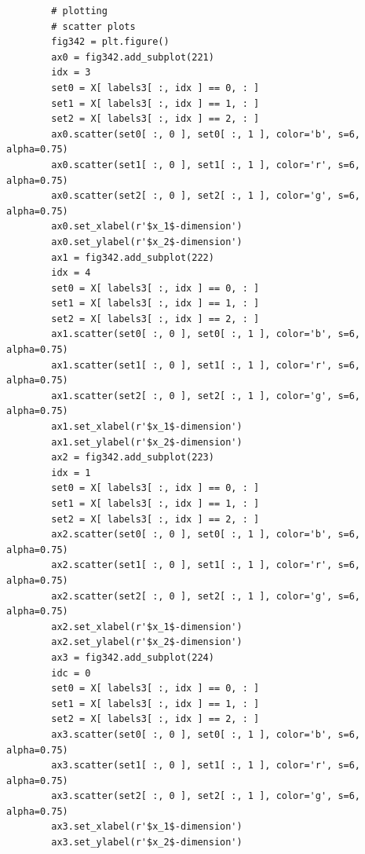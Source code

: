 \begin{verbatim}
        # plotting
        # scatter plots
        fig342 = plt.figure()
        ax0 = fig342.add_subplot(221)
        idx = 3
        set0 = X[ labels3[ :, idx ] == 0, : ]
        set1 = X[ labels3[ :, idx ] == 1, : ]
        set2 = X[ labels3[ :, idx ] == 2, : ]
        ax0.scatter(set0[ :, 0 ], set0[ :, 1 ], color='b', s=6, alpha=0.75)
        ax0.scatter(set1[ :, 0 ], set1[ :, 1 ], color='r', s=6, alpha=0.75)
        ax0.scatter(set2[ :, 0 ], set2[ :, 1 ], color='g', s=6, alpha=0.75)
        ax0.set_xlabel(r'$x_1$-dimension')
        ax0.set_ylabel(r'$x_2$-dimension')
        ax1 = fig342.add_subplot(222)
        idx = 4
        set0 = X[ labels3[ :, idx ] == 0, : ]
        set1 = X[ labels3[ :, idx ] == 1, : ]
        set2 = X[ labels3[ :, idx ] == 2, : ]
        ax1.scatter(set0[ :, 0 ], set0[ :, 1 ], color='b', s=6, alpha=0.75)
        ax1.scatter(set1[ :, 0 ], set1[ :, 1 ], color='r', s=6, alpha=0.75)
        ax1.scatter(set2[ :, 0 ], set2[ :, 1 ], color='g', s=6, alpha=0.75)
        ax1.set_xlabel(r'$x_1$-dimension')
        ax1.set_ylabel(r'$x_2$-dimension')
        ax2 = fig342.add_subplot(223)
        idx = 1
        set0 = X[ labels3[ :, idx ] == 0, : ]
        set1 = X[ labels3[ :, idx ] == 1, : ]
        set2 = X[ labels3[ :, idx ] == 2, : ]
        ax2.scatter(set0[ :, 0 ], set0[ :, 1 ], color='b', s=6, alpha=0.75)
        ax2.scatter(set1[ :, 0 ], set1[ :, 1 ], color='r', s=6, alpha=0.75)
        ax2.scatter(set2[ :, 0 ], set2[ :, 1 ], color='g', s=6, alpha=0.75)
        ax2.set_xlabel(r'$x_1$-dimension')
        ax2.set_ylabel(r'$x_2$-dimension')
        ax3 = fig342.add_subplot(224)
        idc = 0
        set0 = X[ labels3[ :, idx ] == 0, : ]
        set1 = X[ labels3[ :, idx ] == 1, : ]
        set2 = X[ labels3[ :, idx ] == 2, : ]
        ax3.scatter(set0[ :, 0 ], set0[ :, 1 ], color='b', s=6, alpha=0.75)
        ax3.scatter(set1[ :, 0 ], set1[ :, 1 ], color='r', s=6, alpha=0.75)
        ax3.scatter(set2[ :, 0 ], set2[ :, 1 ], color='g', s=6, alpha=0.75)
        ax3.set_xlabel(r'$x_1$-dimension')
        ax3.set_ylabel(r'$x_2$-dimension')


\end{verbatim}

